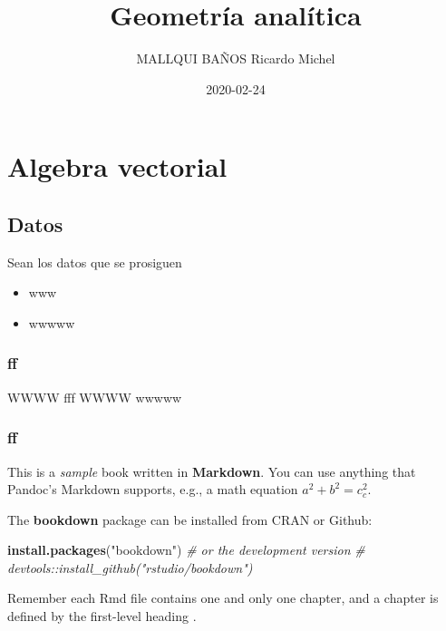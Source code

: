 \documentclass[12pt,]{report}
\title{Geometría analítica}
\author{MALLQUI BAÑOS Ricardo Michel}
\date{2020-02-24}
\newenvironment{Shaded}{\begin{snugshade}}{\end{snugshade}}
\newcommand{\CommentTok}[1]{\textcolor[rgb]{0.56,0.35,0.01}{\textit{#1}}}
\newcommand{\KeywordTok}[1]{\textcolor[rgb]{0.13,0.29,0.53}{\textbf{#1}}}
\newcommand{\NormalTok}[1]{#1}
\newcommand{\StringTok}[1]{\textcolor[rgb]{0.31,0.60,0.02}{#1}}
\providecommand{\tightlist}{%
  \setlength{\itemsep}{0pt}\setlength{\parskip}{0pt}}
\theoremstyle{definition}
\theoremstyle{definition}
\theoremstyle{definition}
\theoremstyle{remark}
\begin{document}
\maketitle

{
\setcounter{tocdepth}{1}
\tableofcontents
}
\hypertarget{algebra-vectorial}{%
\chapter{Algebra vectorial}\label{algebra-vectorial}}

\hypertarget{datos}{%
\section{Datos}\label{datos}}

Sean los datos que se prosiguen

\begin{itemize}
\tightlist
\item
  www
\item
  wwwww
\end{itemize}

\hypertarget{ff}{%
\subsection{ff}\label{ff}}

WWWW fff
WWWW wwwww

\hypertarget{ff-1}{%
\subsection{ff}\label{ff-1}}

This is a \emph{sample} book written in \textbf{Markdown}. You can use anything that Pandoc's Markdown supports, e.g., a math equation \(a^2 + b^2 = c^2_c\).

The \textbf{bookdown} package can be installed from CRAN or Github:

\begin{Shaded}
\begin{Highlighting}[]
\KeywordTok{install.packages}\NormalTok{(}\StringTok{"bookdown"}\NormalTok{)}
\CommentTok{# or the development version}
\CommentTok{# devtools::install_github("rstudio/bookdown")}
\end{Highlighting}
\end{Shaded}

Remember each Rmd file contains one and only one chapter, and a chapter is defined by the first-level heading .
\end{document}
